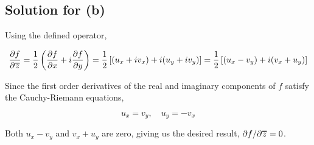 \documentclass{scrartcl}
\newcommand\Overline[2][0.8pt]{%
  \begin{tikzpicture}[baseline=(a.base)]
    \node[inner xsep=0pt,inner ysep=1.5pt] (a) {$#2$};
    \draw[line width= #1] (a.north west) -- (a.north east);
  \end{tikzpicture}
}
\begin{document}
\subsection{Solution for (b)}
Using the defined operator,

\begin{align*}
  \frac{\partial f}{\partial \Overline{z}} = \frac{1}{2}\left( \frac{\partial f}{\partial x} + i \frac{\partial f}{\partial y} \right) = \frac{1}{2}\left[ (u_x + iv_x) + i(u_y + iv_y) \right] = \frac{1}{2}\left[ (u_x - v_y) + i(v_x + u_y) \right]
\end{align*}

Since the first order derivatives of the real and imaginary components of \(f\) satisfy the Cauchy-Riemann equations,

\[
  u_x = v_y, \quad u_y = -v_x
\]

Both \(u_x - v_y\) and \(v_x + u_y\) are zero, giving us the desired result, \(\partial f / \partial \Overline{z} = 0\).
\end{document}
